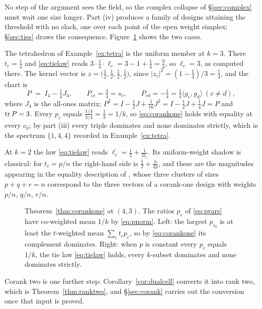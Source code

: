 No step of the argument sees the field, so the complex collapse of
\S\ref{sec:complex} must wait one size longer.  Part (iv) produces a
family of designs attaining the threshold with no slack, one over each
point of the open weight simplex; \S\ref{sec:ties} draws the consequence.
Figure~\ref{fig:jensen} shows the two cases.

\begin{example}\label{ex:tetrachart}
The tetrahedron of Example~\ref{ex:tetra} is the uniform member at $k=3$.
There $t_c=\tfrac14$ and \eqref{eq:tielaw} reads
$3\cdot\tfrac14\cdot\ell_c=3-1+\tfrac14=\tfrac94$, so $\ell_c=3$, as
computed there.  The kernel vector is
$z=\bigl(\tfrac12,\tfrac12,\tfrac12,\tfrac12\bigr)$, since
$\lvert z_c\rvert^2=(1-\tfrac14)/3=\tfrac14$, and the chart is
\[
  P\;=\;I_4-\tfrac14J_4,
  \qquad
  P_{cc}=\tfrac34=s_c,
  \qquad
  P_{cd}=-\tfrac14=\tfrac14\langle g_c,g_d\rangle\ (c\ne d),
\]
where $J_4$ is the all-ones matrix; $P^2=I-\tfrac12J+\tfrac1{16}J^2
=I-\tfrac12J+\tfrac14J=P$ and $\operatorname{tr} P=3$.  Every $p_c$ equals
$\tfrac{1/4}{3/4}=\tfrac13=1/k$, so \eqref{eq:corankone} holds with
equality at every $c_0$; by part (iii) every triple dominates and none
dominates strictly, which is the spectrum $\{1,4,4\}$ recorded in
Example~\ref{ex:tetra}.
\end{example}

\begin{remark}\label{rem:ktwo}
At $k=2$ the law \eqref{eq:tielaw} reads
$\ell_c=\tfrac12+\tfrac1{2t_c}$.  Its uniform-weight shadow is classical:
for $t_c=p/n$ the right-hand side is $\tfrac12+\tfrac{n}{2p}$, and these
are the magnitudes appearing in the equality description of
\cite[Proposition~1]{Nesterenko2026real}, whose three clusters of sizes
$p+q+r=n$ correspond to the three vectors of a corank-one design with
weights $p/n$, $q/n$, $r/n$.
\end{remark}

\begin{figure}[ht]
  \centering
  
  \caption{Theorem~\ref{thm:corankone} at $(4,3)$.  The ratios $p_c$ of
  \eqref{eq:pvars} have co-weighted mean $1/k$ by \eqref{eq:pnorm}.  Left:
  the largest $p_{c_0}$ is at least the $t$-weighted mean $\sum_ct_cp_c$,
  so by \eqref{eq:corankone} its complement dominates.  Right: when $p$ is
  constant every $p_c$ equals $1/k$, the tie law \eqref{eq:tielaw} holds,
  every $k$-subset dominates and none dominates strictly.}
  \label{fig:jensen}
\end{figure}

Corank two is one further step: Corollary~\ref{cor:dualcell} converts it
into rank two, which is Theorem~\ref{thm:ranktwo}, and \S\ref{sec:corank}
carries out the conversion once that input is proved.
